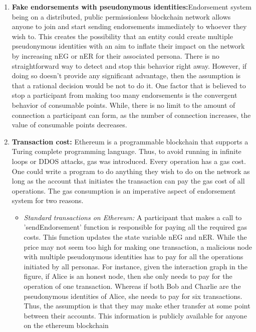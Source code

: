 \begin{enumerate}
	\item \label{item:fakeeds} \textbf{Fake endorsements with pseudonymous
		identities:}Endorsement system being on a
		distributed, public permissionless blockchain network allows anyone to
		join and start sending endorsements immediately to whoever they wish
		to. This creates the possibility that an entity could create multiple
		pseudonymous identities with an aim to inflate their impact on the
		network by increasing nEG or nER for their associated persona.  There
		is no straightforward way to detect and stop this behavior right away.
		However, if doing so doesn't provide any significant advantage, then
		the assumption is that a rational decision would be not to do it.  One
		factor that is believed to stop a participant from making too many
		endorsements is the convergent behavior of consumable points. While,
		there is no limit to the amount of connection a participant can form,
		as the number of connection increases, the value of consumable points
		decreases. 
	\item \textbf{Transaction cost:} Ethereum is a programmable blockchain that
		supports a Turing complete programming language. Thus, to avoid running
		in infinite loops or DDOS attacks, gas was introduced. Every operation
		has a gas cost. One could write a program to do anything they wish to
		do on the network as long as the account that initiates the transaction
		can pay the gas cost of all operations. The gas consumption is an
		imperative aspect of endorsement system for two reasons. \\
		\begin{itemize}
			\item \textit{Standard transactions on Ethereum:} A participant
				that makes a call to 'sendEndorsement' function is responsible
				for paying all the required gas costs. This function updates
				the state variable nEG and nER. While the price may not seem
				too high for making one transaction, a malicious node with
				multiple pseudonymous identities has to pay for all the
				operations initiated by all personas. For instance, given the
				interaction graph in the figure, if Alice is an honest node,
				then she only needs to pay for the operation of one
				transaction. Whereas if both Bob and Charlie are the
				pseudonymous identities of Alice, she needs to pay for six
				transactions. Thus, the assumption is that they may make ether
				transfer at some point between their accounts. This information
				is publicly available for anyone on the ethereum blockchain

\end{itemize}
\end{enumerate}

